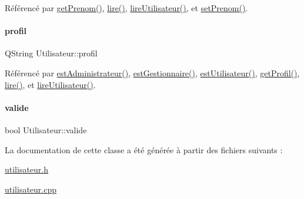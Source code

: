 Référencé par \hyperlink{class_utilisateur_ac4483808ad54888c66a4235133d135d5}{get\+Prenom()}, \hyperlink{class_utilisateur_aa7d1a92ff4e06e9d302369f6c48884e1}{lire()}, \hyperlink{class_utilisateur_a5911f84daf6d47d7f50e6d16022b292e}{lire\+Utilisateur()}, et \hyperlink{class_utilisateur_a41e12e2817f4b6ad1fe5ef0f3417caf3}{set\+Prenom()}.

\mbox{\label{class_utilisateur_ab03707f32fadf99ae0a0a27d59470646}} 
\paragraph{\texorpdfstring{profil}{profil}}
{\footnotesize\ttfamily Q\+String Utilisateur\+::profil\hspace{0.3cm}{\ttfamily [private]}}



Référencé par \hyperlink{class_utilisateur_a2c4ede0ec936ebd64d73df1e1dde3a5d}{est\+Administrateur()}, \hyperlink{class_utilisateur_a3c86ddd77b243fd3f12ad2e85ff06759}{est\+Gestionnaire()}, \hyperlink{class_utilisateur_a9b01ce9996c2242b1be952c3c7574fac}{est\+Utilisateur()}, \hyperlink{class_utilisateur_a8d838ae68c0be760d6fb4a27d8d7ba08}{get\+Profil()}, \hyperlink{class_utilisateur_aa7d1a92ff4e06e9d302369f6c48884e1}{lire()}, et \hyperlink{class_utilisateur_a5911f84daf6d47d7f50e6d16022b292e}{lire\+Utilisateur()}.

\mbox{\label{class_utilisateur_ad8b12c53bc07491a54895d48631ef6a2}} 
\paragraph{\texorpdfstring{valide}{valide}}
{\footnotesize\ttfamily bool Utilisateur\+::valide\hspace{0.3cm}{\ttfamily [private]}}



La documentation de cette classe a été générée à partir des fichiers suivants \+:\begin{DoxyCompactItemize}
\item 
\hyperlink{utilisateur_8h}{utilisateur.\+h}\item 
\hyperlink{utilisateur_8cpp}{utilisateur.\+cpp}\end{DoxyCompactItemize}
